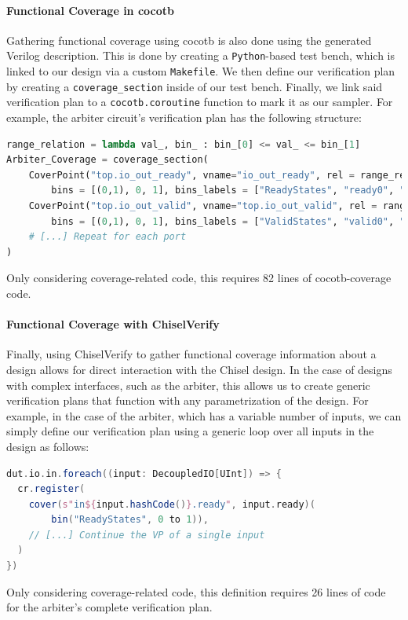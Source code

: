 \documentclass[conference]{IEEEtran}
\begin{document}
\paragraph{Functional Coverage in cocotb} Gathering functional coverage using cocotb is also done using the generated Verilog description.
This is done by creating a \texttt{Python}-based test bench, which is linked to our design via a custom \texttt{Makefile}.
We then define our verification plan by creating a \texttt{coverage\_section} inside of our test bench.
Finally, we link said verification plan to a \texttt{cocotb.coroutine} function to mark it as our sampler.
For example, the arbiter circuit's verification plan has the following structure:
 \begin{lstlisting}[language=Python]
 range_relation = lambda val_, bin_ : bin_[0] <= val_ <= bin_[1]
Arbiter_Coverage = coverage_section(
    CoverPoint("top.io_out_ready", vname="io_out_ready", rel = range_relation, 
        bins = [(0,1), 0, 1], bins_labels = ["ReadyStates", "ready0", "ready1"]),
    CoverPoint("top.io_out_valid", vname="top.io_out_valid", rel = range_relation, 
        bins = [(0,1), 0, 1], bins_labels = ["ValidStates", "valid0", "valid1"]),
    # [...] Repeat for each port
)
 \end{lstlisting}
 Only considering coverage-related code, this requires 82 lines of cocotb-coverage code.
 
\paragraph{Functional Coverage with ChiselVerify} Finally, using ChiselVerify to gather functional coverage information about a design allows for direct interaction with the Chisel design.
In the case of designs with complex interfaces, such as the arbiter, this allows us to create generic verification plans that function with any parametrization of the design.
For example, in the case of the arbiter, which has a variable number of inputs, we can simply define our verification plan using a generic loop over all inputs in the design as follows:
 \begin{lstlisting}[language=scala]
dut.io.in.foreach((input: DecoupledIO[UInt]) => {
  cr.register(
    cover(s"in${input.hashCode()}.ready", input.ready)(
        bin("ReadyStates", 0 to 1)),
    // [...] Continue the VP of a single input
  )
})
 \end{lstlisting}
Only considering coverage-related code, this definition requires 26 lines of code for the arbiter's complete verification plan.
\end{document}
